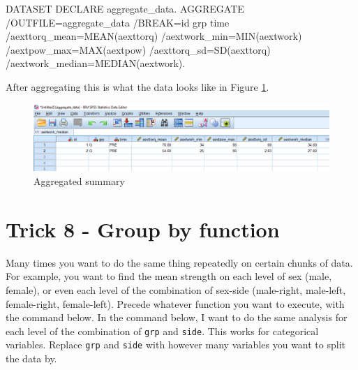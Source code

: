 \documentclass[
]{book}
\newenvironment{Shaded}{\begin{snugshade}}{\end{snugshade}}
\newcommand{\FunctionTok}[1]{\textcolor[rgb]{0.00,0.00,0.00}{#1}}
\newcommand{\NormalTok}[1]{#1}
\newcommand{\OtherTok}[1]{\textcolor[rgb]{0.56,0.35,0.01}{#1}}
\newcommand{\SpecialCharTok}[1]{\textcolor[rgb]{0.00,0.00,0.00}{#1}}
\newcommand{\StringTok}[1]{\textcolor[rgb]{0.31,0.60,0.02}{#1}}
\begin{document}
\begin{Shaded}
\begin{Highlighting}[]
\NormalTok{DATASET DECLARE aggregate\_data.}
\NormalTok{AGGREGATE}
  \SpecialCharTok{/}\NormalTok{OUTFILE}\OtherTok{=}\StringTok{\textquotesingle{}aggregate\_data\textquotesingle{}}
  \SpecialCharTok{/}\NormalTok{BREAK}\OtherTok{=}\NormalTok{id grp time }
  \SpecialCharTok{/}\NormalTok{aexttorq\_mean}\OtherTok{=}\FunctionTok{MEAN}\NormalTok{(aexttorq) }
  \SpecialCharTok{/}\NormalTok{aextwork\_min}\OtherTok{=}\FunctionTok{MIN}\NormalTok{(aextwork) }
  \SpecialCharTok{/}\NormalTok{aextpow\_max}\OtherTok{=}\FunctionTok{MAX}\NormalTok{(aextpow) }
  \SpecialCharTok{/}\NormalTok{aexttorq\_sd}\OtherTok{=}\FunctionTok{SD}\NormalTok{(aexttorq) }
  \SpecialCharTok{/}\NormalTok{aextwork\_median}\OtherTok{=}\FunctionTok{MEDIAN}\NormalTok{(aextwork).}
\end{Highlighting}
\end{Shaded}

After aggregating this is what the data looks like in Figure \ref{fig:aggregate}.

\begin{figure}
\includegraphics[width=1\linewidth]{images/aggregate} \caption{Aggregated summary}\label{fig:aggregate}
\end{figure}

\hypertarget{trick-8---group-by-function}{%
\chapter*{Trick 8 - Group by function}\label{trick-8---group-by-function}}

Many times you want to do the same thing repeatedly on certain chunks of data. For example, you want to find the mean strength on each level of sex (male, female), or even each level of the combination of sex-side (male-right, male-left, female-right, female-left). Precede whatever function you want to execute, with the command below. In the command below, I want to do the same analysis for each level of the combination of \texttt{grp} and \texttt{side}. This works for categorical variables. Replace \texttt{grp} and \texttt{side} with however many variables you want to split the data by.
\end{document}
